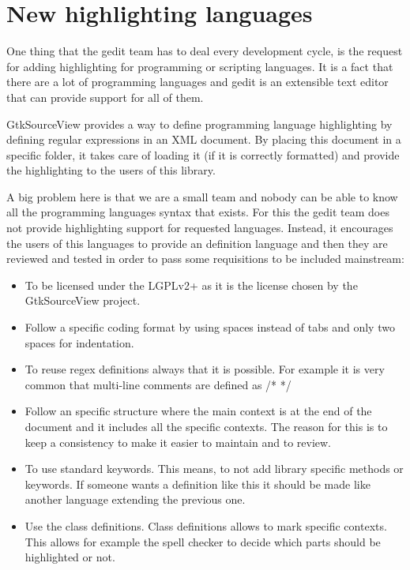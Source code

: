 
\chapter{New highlighting languages}

One thing that the gedit team has to deal every development cycle, is the request for adding highlighting for programming or scripting languages. It is a fact that there are a lot of programming languages and gedit is an extensible text editor that can provide support for all of them.

GtkSourceView provides a way to define programming language highlighting by defining regular expressions in an XML document. By placing this document in a specific folder, it takes care of loading it (if it is correctly formatted) and provide the highlighting to the users of this library.

A big problem here is that we are a small team and nobody can be able to know all the programming languages syntax that exists. For this the gedit team does not provide highlighting support for requested languages. Instead, it encourages the users of this languages to provide an definition language and then they are reviewed and tested in order to pass some requisitions to be included mainstream:
\begin{itemize}
  \item To be licensed under the LGPLv2+ as it is the license chosen by the GtkSourceView project.
  \item Follow a specific coding format by using spaces instead of tabs and only two spaces for indentation.
  \item To reuse regex definitions always that it is possible. For example it is very common that multi-line comments are defined as /* */
  \item Follow an specific structure where the main context is at the end of the document and it includes all the specific contexts. The reason for this is to keep a consistency to make it easier to maintain and to review.
  \item To use standard keywords. This means, to not add library specific methods or keywords. If someone wants a definition like this it should be made like another language extending the previous one.
  \item Use the class definitions. Class definitions allows to mark specific contexts. This allows for example the spell checker to decide which parts should be highlighted or not.
\end{itemize}

